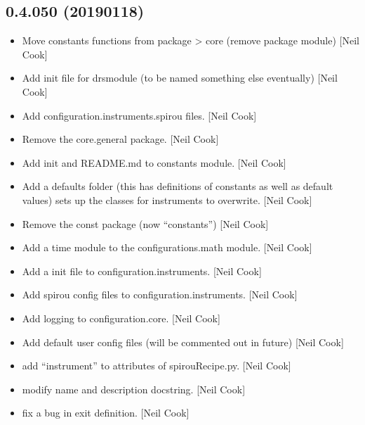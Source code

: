 \documentclass[a4paper,10pt,english]{report}
\begin{document}
\subsection{0.4.050 (2019\sphinxhyphen{}01\sphinxhyphen{}18)}
\label{\detokenize{misc/changelog:id232}}\begin{itemize}
\item {} 
Move constants functions from package \textendash{}\textgreater{} core (remove package module)
{[}Neil Cook{]}

\item {} 
Add init file for drsmodule (to be named something else eventually)
{[}Neil Cook{]}

\item {} 
Add configuration.instruments.spirou files. {[}Neil Cook{]}

\item {} 
Remove the core.general package. {[}Neil Cook{]}

\item {} 
Add init and README.md to constants module. {[}Neil Cook{]}

\item {} 
Add a defaults folder (this has definitions of constants as well as
default values) \sphinxhyphen{} sets up the classes for instruments to overwrite.
{[}Neil Cook{]}

\item {} 
Remove the const package (now “constants”) {[}Neil Cook{]}

\item {} 
Add a time module to the configurations.math module. {[}Neil Cook{]}

\item {} 
Add a init file to configuration.instruments. {[}Neil Cook{]}

\item {} 
Add spirou config files to configuration.instruments. {[}Neil Cook{]}

\item {} 
Add logging to configuration.core. {[}Neil Cook{]}

\item {} 
Add default user config files (will be commented out in future) {[}Neil
Cook{]}

\item {} 
 \sphinxhyphen{} add “instrument” to attributes of spirouRecipe.py.
{[}Neil Cook{]}

\item {} 
 \sphinxhyphen{} modify name and description docstring. {[}Neil Cook{]}

\item {} 
 \sphinxhyphen{} fix a bug in exit definition. {[}Neil Cook{]}

\end{itemize}
\end{document}
